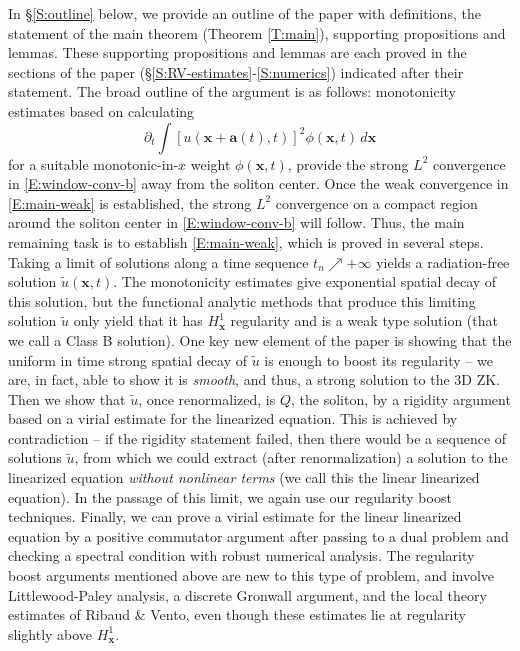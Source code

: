 \documentclass[12pt,letterpaper]{amsart}
\theoremstyle{remark}
\numberwithin{equation}{section}
\numberwithin{theorem}{section}
\numberwithin{table}{section}
\begin{document}
In \S\ref{S:outline} below, we provide an outline of the paper with definitions, the statement of the main theorem (Theorem \ref{T:main}), supporting propositions and lemmas.  These supporting propositions and lemmas are each proved in the sections of the paper (\S \ref{S:RV-estimates}-\ref{S:numerics}) indicated after their statement.  The broad outline of the argument is as follows: monotonicity estimates based on calculating 
$$
\partial_t \int [u(\mathbf{x}+\mathbf{a}(t), t)]^2 \phi(\mathbf{x} ,t) 
\, d\mathbf{x}
$$
for a suitable monotonic-in-$x$ weight $\phi(\mathbf{x},t)$, 
provide the strong $L^2$ convergence in \eqref{E:window-conv-b} away from the soliton center.  Once the weak convergence in \eqref{E:main-weak} is established, the strong $L^2$ convergence on a compact region around the soliton center in \eqref{E:window-conv-b} will follow.  Thus, the main remaining task is to establish \eqref{E:main-weak}, which is proved in several steps.  Taking a limit of solutions along a time sequence $t_n\nearrow +\infty$ yields a radiation-free solution $\tilde u(\mathbf{x},t)$.  The monotonicity estimates give exponential spatial decay of this solution, but the functional analytic methods that produce this limiting solution $\tilde u$ only  yield that it has $H_{\mathbf{x}}^1$ regularity and is a weak type solution (that we call a Class B solution).  One key new element of the paper is showing that the uniform in time strong spatial decay of $\tilde u$ is enough to boost its regularity -- we are, in fact, able to show it is \emph{smooth}, and thus, a strong solution to the 3D ZK. Then we show that $\tilde u$, once renormalized, is $Q$, the soliton, by a rigidity argument based on a virial estimate for the linearized equation.  This is achieved by contradiction -- if the rigidity statement failed, then there would be a sequence of solutions $\tilde u$, from which we could extract (after renormalization) a solution to the linearized equation \emph{without nonlinear terms} (we call this the linear linearized equation).  In the passage of this limit, we again use our regularity boost techniques.  Finally, we can prove a virial estimate for the linear linearized equation by a positive commutator argument after passing to a dual problem and checking a spectral condition with robust numerical analysis.  The regularity boost arguments mentioned above are new to this type of problem, and involve Littlewood-Paley analysis, a discrete Gronwall argument, and the local theory estimates of Ribaud \& Vento, even though these estimates lie at regularity slightly above $H_{\mathbf{x}}^1$.  
\end{document}
